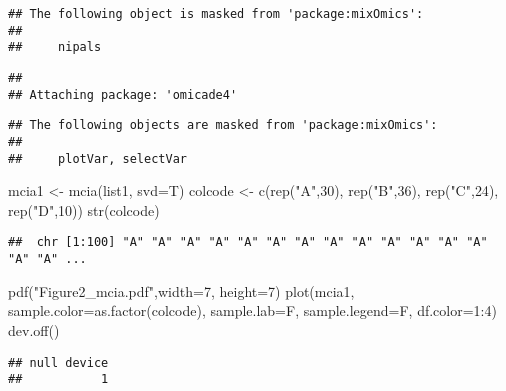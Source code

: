 \documentclass[
]{article}
\newenvironment{Shaded}{\begin{snugshade}}{\end{snugshade}}
\newcommand{\AttributeTok}[1]{\textcolor[rgb]{0.77,0.63,0.00}{#1}}
\newcommand{\DecValTok}[1]{\textcolor[rgb]{0.00,0.00,0.81}{#1}}
\newcommand{\FunctionTok}[1]{\textcolor[rgb]{0.00,0.00,0.00}{#1}}
\newcommand{\NormalTok}[1]{#1}
\newcommand{\OtherTok}[1]{\textcolor[rgb]{0.56,0.35,0.01}{#1}}
\newcommand{\SpecialCharTok}[1]{\textcolor[rgb]{0.00,0.00,0.00}{#1}}
\newcommand{\StringTok}[1]{\textcolor[rgb]{0.31,0.60,0.02}{#1}}
\begin{document}
\begin{verbatim}
## The following object is masked from 'package:mixOmics':
## 
##     nipals
\end{verbatim}

\begin{verbatim}
## 
## Attaching package: 'omicade4'
\end{verbatim}

\begin{verbatim}
## The following objects are masked from 'package:mixOmics':
## 
##     plotVar, selectVar
\end{verbatim}

\begin{Shaded}
\begin{Highlighting}[]
\NormalTok{mcia1 }\OtherTok{\textless{}{-}} \FunctionTok{mcia}\NormalTok{(list1, }\AttributeTok{svd=}\NormalTok{T)}
\NormalTok{colcode }\OtherTok{\textless{}{-}} \FunctionTok{c}\NormalTok{(}\FunctionTok{rep}\NormalTok{(}\StringTok{"A"}\NormalTok{,}\DecValTok{30}\NormalTok{), }\FunctionTok{rep}\NormalTok{(}\StringTok{"B"}\NormalTok{,}\DecValTok{36}\NormalTok{), }\FunctionTok{rep}\NormalTok{(}\StringTok{"C"}\NormalTok{,}\DecValTok{24}\NormalTok{), }\FunctionTok{rep}\NormalTok{(}\StringTok{"D"}\NormalTok{,}\DecValTok{10}\NormalTok{))}
\FunctionTok{str}\NormalTok{(colcode)}
\end{Highlighting}
\end{Shaded}

\begin{verbatim}
##  chr [1:100] "A" "A" "A" "A" "A" "A" "A" "A" "A" "A" "A" "A" "A" "A" "A" ...
\end{verbatim}

\begin{Shaded}
\begin{Highlighting}[]
\FunctionTok{pdf}\NormalTok{(}\StringTok{"Figure2\_mcia.pdf"}\NormalTok{,}\AttributeTok{width=}\DecValTok{7}\NormalTok{, }\AttributeTok{height=}\DecValTok{7}\NormalTok{)}
\FunctionTok{plot}\NormalTok{(mcia1, }\AttributeTok{sample.color=}\FunctionTok{as.factor}\NormalTok{(colcode), }\AttributeTok{sample.lab=}\NormalTok{F, }\AttributeTok{sample.legend=}\NormalTok{F,}
     \AttributeTok{df.color=}\DecValTok{1}\SpecialCharTok{:}\DecValTok{4}\NormalTok{)}
\FunctionTok{dev.off}\NormalTok{()}
\end{Highlighting}
\end{Shaded}

\begin{verbatim}
## null device 
##           1
\end{verbatim}
\end{document}
